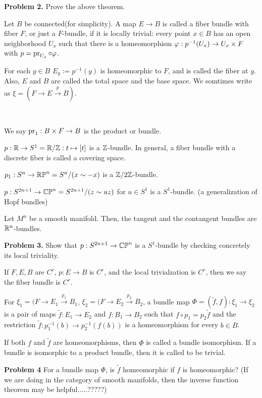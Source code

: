 \documentclass{../../small}
\begin{document}
\textbf{Problem 2.} Prove the above theorem.

\begin{defn}
Let $B$ be connected(for simplicity).
A map $E\to B$ is called a fiber bundle with fiber $F$, or just a $F$-bundle, if it is locally trivial: every point $x\in B$ has an open neighborhood $U_x$ such that there is a homeomorphism $\varphi:p^{-1}(U_x)\to U_x\times F$ with $p=\operatorname{pr}_{U_x}\circ\varphi$.

For each $y\in B$ $E_y:=p^{-1}(y)$ is homeomorphic to $F$, and is called the fiber at $y$.
Also, $E$ and $B$ are called the total space and the base space.
We somtimes write as $\xi=(F\to E\xrightarrow{p}B)$.
\end{defn}
\begin{ex*}\,
\begin{parts}
\item We say $\operatorname{pr}_1:B\times F\to B$ is the product or bundle.
\item $p:\mathbb{R}\to S^1=\mathbb{R}/\mathbb{Z}:t\mapsto[t]$ is a $\mathbb{Z}$-bundle. In general, a fiber bundle with a discrete fiber is called a covering space.
\item $p_1:S^n\to\mathbb{RP}^n=S^n/(x\sim-x)$ is a $\mathbb{Z}/2\mathbb{Z}$-bundle.
\item $p:S^{2n+1}\to\mathbb{CP}^n=S^{2n+1}/(z\sim uz)$ for $u\in S^1$ is a $S^1$-bundle. (a generalization of Hopf bundles)
\item Let $M^n$ be a smooth manifold. Then, the tangent and the contangent bundles are $\mathbb{R}^n$-bundles.
\end{parts}
\end{ex*}

\textbf{Problem 3.} Show that $p:S^{2n+1}\to\mathbb{CP}^n$ is a $S^1$-bundle by checking concretely its local triviality.

\begin{defn}
If $F,E,B$ are $C^r$, $p:E\to B$ is $C^r$, and the local trivialzation is $C^r$, then we say the fiber bundle is $C^r$.
\end{defn}
\begin{defn}
For $\xi_1=(F\to E_1\xrightarrow{p_1}B_1$, $\xi_2=(F\to E_2\xrightarrow{p_2}B_2$, a bundle map $\Phi=(\tilde f,f):\xi_1\to\xi_2$ is a pair of maps $\tilde f:E_1\to E_2$ and $f:B_1\to B_2$ such that $f\circ p_1=p_2\tilde f$ and the restriction $\tilde f:p_1^{-1}(b)\to p_2^{-1}(f(b))$ is a homeomorphism for every $b\in B$.

If both $f$ and $\tilde f$ are homeomorphisms, then $\Phi$ is called a bundle isomorphism.
If a bundle is isomorphic to a product bundle, then it is called to be trivial.
\end{defn}

\textbf{Problem 4} For a bundle map $\Phi$, is $\tilde f$ homeomorphic if $f$ is homeomorphic? (If we are doing in the category of smooth manifolds, then the inverse function theorem may be helpful.....?????)
\end{document}
